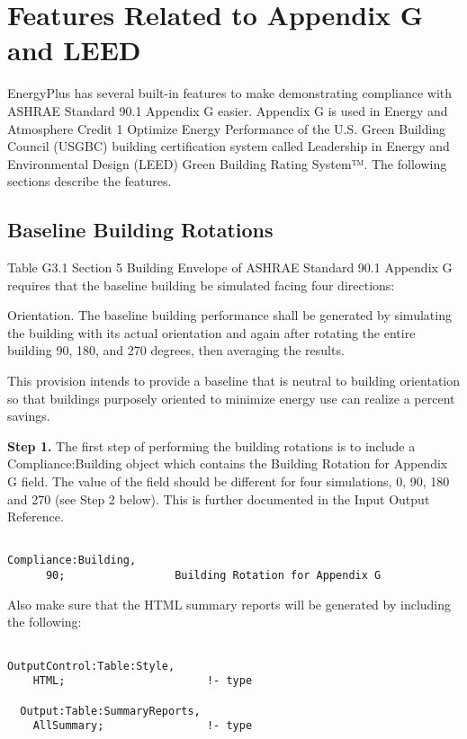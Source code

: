 \section{Features Related to Appendix G and LEED}\label{features-related-to-appendix-g-and-leed}

EnergyPlus has several built-in features to make demonstrating compliance with ASHRAE Standard 90.1 Appendix G easier. Appendix G is used in Energy and Atmosphere Credit 1 Optimize Energy Performance of the U.S. Green Building Council (USGBC) building certification system called Leadership in Energy and Environmental Design (LEED) Green Building Rating System™. The following sections describe the features.

\subsection{Baseline Building Rotations}\label{baseline-building-rotations}

Table G3.1 Section 5 Building Envelope of ASHRAE Standard 90.1 Appendix G requires that the baseline building be simulated facing four directions:

Orientation. The baseline building performance shall be generated by simulating the building with its actual orientation and again after rotating the entire building 90, 180, and 270 degrees, then averaging the results.

This provision intends to provide a baseline that is neutral to building orientation so that buildings purposely oriented to minimize energy use can realize a percent savings.

\textbf{Step 1.} The first step of performing the building rotations is to include a Compliance:Building object which contains the Building Rotation for Appendix G field. The value of the field should be different for four simulations, 0, 90, 180 and 270 (see Step 2 below). This is further documented in the Input Output Reference.

\begin{lstlisting}

Compliance:Building,
      90;                 Building Rotation for Appendix G
\end{lstlisting}

Also make sure that the HTML summary reports will be generated by including the following:

\begin{lstlisting}

OutputControl:Table:Style,
    HTML;                      !- type

  Output:Table:SummaryReports,
    AllSummary;                !- type
\end{lstlisting}

